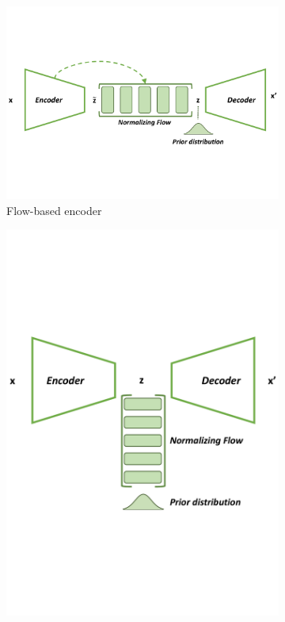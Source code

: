 \begin{figure}[t!]
    \centering
    \begin{subfigure}{0.53\textwidth}
        \centering\vspace{8mm}
        \includegraphics[width=\linewidth]{figures/related_work_figures/VAE_Flow_1.pdf}\vspace{8mm}
        \caption{Flow-based encoder}
        \label{fig:related_work_VAE_flow_hybrids_1}
    \end{subfigure} \hspace{10mm}
    \begin{subfigure}{0.39\textwidth}
        \centering
        \includegraphics[width=\linewidth]{figures/related_work_figures/VAE_Flow_2.pdf}

\end{subfigure}
\end{figure}
